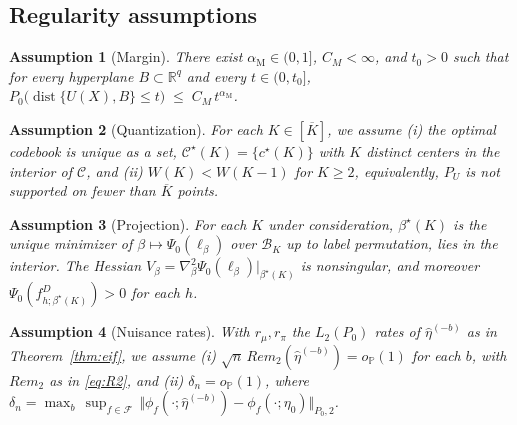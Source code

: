 \documentclass[11pt]{article}
\newtheorem{assumption}{Assumption}
\newcommand{\Pp}{\mathbb P}
\newcommand{\R}{\mathbb R}
\newcommand{\opro}{o_{\Pp}}
\newcommand{\dist}{\operatorname{dist}}
\newcommand{\calB}{\mathcal B}
\newcommand{\calC}{\mathcal C}
\newcommand{\calF}{\mathcal F}
\newcommand{\hateta}{\widehat\eta}
\newcommand{\am}{\alpha_{\mathrm M}}
\begin{document}
\subsection{Regularity assumptions}\label{sec:assumptions}

\begin{assumption}[Margin]\label{ass:margin}
There exist $\am\in(0,1]$, $C_M<\infty$, and $t_0>0$ such that for every hyperplane $B\subset\R^q$ and every $t\in(0,t_0]$,
$P_0\bigl(\dist\{U(X),B\}\le t\bigr)\;\le\;C_M\,t^{\am}$.
\end{assumption}

\begin{assumption}[Quantization]\label{ass:quant}
For each $K\in[\overline K]$, we assume \textup{(i)} the optimal codebook is unique as a set, $\calC^\star(K)=\{c^\star(K)\}$ with $K$ distinct centers in the interior of $\calC$, and \textup{(ii)} $W(K)<W(K-1)$ for $K\ge2$, equivalently, $P_U$ is not supported on fewer than $\overline K$ points. 
\end{assumption}

\begin{assumption}[Projection]\label{ass:proj}
For each $K$ under consideration, $\beta^\star(K)$ is the unique minimizer of $\beta\mapsto\Psi_0(\ell_\beta)$ over $\calB_K$ up to label permutation, lies in the interior. The Hessian $V_\beta=\nabla^2_\beta\Psi_0(\ell_\beta)\big|_{\beta^\star(K)}$ is nonsingular, and moreover $\Psi_0(f^D_{h;\beta^\star(K)})>0$ for each $h$.
\end{assumption}

\begin{assumption}[Nuisance rates]
\label{ass:nuisance}
With $r_\mu,r_\pi$ the $L_2(P_0)$ rates of $\hateta^{(-b)}$ as in Theorem~\ref{thm:eif}, we assume \textup{(i)} $\sqrt n\,Rem_2(\hateta^{(-b)})=\opro(1)$ for each $b$, with $Rem_2$ as in \eqref{eq:R2}, and \textup{(ii)} $\delta_n=\opro(1)$, where $\delta_n=\max_b\,\sup_{f\in\calF}\,\bigl\Vert\phi_f(\cdot;\hateta^{(-b)})-\phi_f(\cdot;\eta_0)\bigr\Vert_{P_0,2}$.
\end{assumption}
\end{document}
